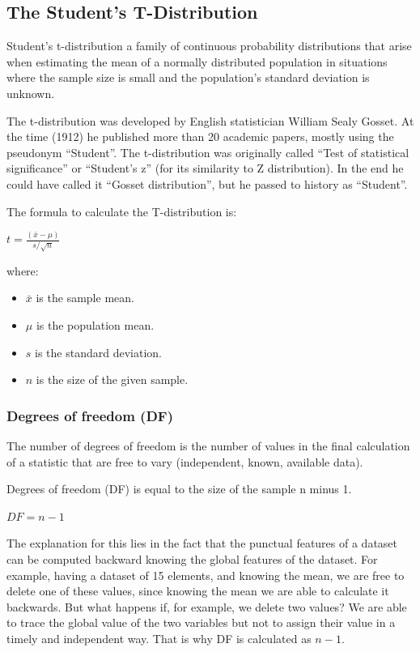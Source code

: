 \documentclass{article}
\begin{document}
\subsection{The Student's T-Distribution}
Student's t-distribution a family of continuous probability distributions that arise when estimating the mean of a normally distributed population in situations where the sample size is small and the population's standard deviation is unknown.

The t-distribution was developed by English statistician William Sealy Gosset. 
At the time (1912) he published more than 20 academic papers, mostly using the pseudonym “Student”.
The t-distribution was originally called “Test of statistical significance” or “Student’s z” (for its similarity to Z distribution).
In the end he could have called it “Gosset distribution”, but he passed to history as “Student”. 

The formula to calculate the T-distribution is:

$t= \frac{(\bar{x} - \mu)}{s/\sqrt{n}}$

where:
\begin{itemize}
    \item $\bar{x}$ is the sample mean.
    \item $\mu$ is the population mean.
    \item $s$ is the standard deviation.
    \item $n$ is the size of the given sample.
\end{itemize}

\subsubsection{Degrees of freedom (DF)}
The number of degrees of freedom is the number of values in the final calculation of a statistic that are free to vary (independent, known, available data).

Degrees of freedom (DF) is equal to the size of the sample n minus 1.

$DF = n - 1$

The explanation for this lies in the fact that the punctual features of a dataset can be computed backward knowing the global features of the dataset.
For example, having a dataset of 15 elements, and knowing the mean, we are free to delete one of these values, since knowing the mean we are able to calculate it backwards.
But what happens if, for example, we delete two values? We are able to trace the global value of the two variables but not to assign their value in a timely and independent way.
That is why DF is calculated as $n - 1$.
\end{document}
